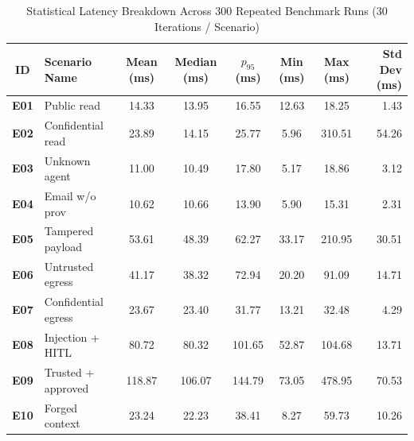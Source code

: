 \begin{table}[htbp]
\centering
\small
\caption{Statistical Latency Breakdown Across 300 Repeated Benchmark Runs (30 Iterations / Scenario)}
\label{tab:benchmark_stats}
\begin{tabularx}{\textwidth}{clcccccr}
\toprule
\textbf{ID} & \textbf{Scenario Name} & \textbf{Mean (ms)} & \textbf{Median (ms)} & \textbf{$p_{95}$ (ms)} & \textbf{Min (ms)} & \textbf{Max (ms)} & \textbf{Std Dev (ms)} \\
\midrule
\textbf{E01} & Public read & 14.33 & 13.95 & 16.55 & 12.63 & 18.25 & 1.43 \\
\textbf{E02} & Confidential read & 23.89 & 14.15 & 25.77 & 5.96 & 310.51 & 54.26 \\
\textbf{E03} & Unknown agent & 11.00 & 10.49 & 17.80 & 5.17 & 18.86 & 3.12 \\
\textbf{E04} & Email w/o prov & 10.62 & 10.66 & 13.90 & 5.90 & 15.31 & 2.31 \\
\textbf{E05} & Tampered payload & 53.61 & 48.39 & 62.27 & 33.17 & 210.95 & 30.51 \\
\textbf{E06} & Untrusted egress & 41.17 & 38.32 & 72.94 & 20.20 & 91.09 & 14.71 \\
\textbf{E07} & Confidential egress & 23.67 & 23.40 & 31.77 & 13.21 & 32.48 & 4.29 \\
\textbf{E08} & Injection + HITL & 80.72 & 80.32 & 101.65 & 52.87 & 104.68 & 13.71 \\
\textbf{E09} & Trusted + approved & 118.87 & 106.07 & 144.79 & 73.05 & 478.95 & 70.53 \\
\textbf{E10} & Forged context & 23.24 & 22.23 & 38.41 & 8.27 & 59.73 & 10.26 \\
\bottomrule
\end{tabularx}
\end{table}

